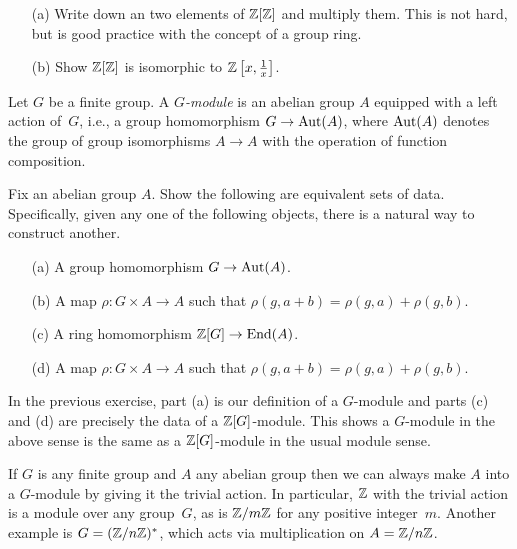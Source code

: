 \begin{exercise}
	\hfill
	\begin{enumerate}
		\item[(a)]
			Write down an two elements of $\mathbb{Z}[\mathbb{Z}]$ and multiply them.
			This is not hard, but is good practice with the concept
			of a group ring.
		\item[(b)]
			Show $\mathbb{Z}[\mathbb{Z}]$ is isomorphic to $\mathbb{Z}\left[x,\frac{1}{x}\right]$.
	\end{enumerate}
\end{exercise}

\begin{definition}
	Let $G$ be a finite group. A \emph{$G$-module} is
	an abelian group $A$ equipped with a left action of~$G$,
	i.e., a group homomorphism $G\to\operatorname{Aut}(A)$, where $\operatorname{Aut}(A)$
	denotes the group of group isomorphisms $A\to A$ with
	the operation of function composition.
\end{definition}

\begin{exercise}\label{ex:equivalentdata}
	Fix an abelian group $A$.
	Show the following are equivalent sets of data.
	Specifically, given any one of the following objects,
	there is a natural way to construct another.
	\begin{enumerate}
		\item[(a)] A group homomorphism $G\to \operatorname{Aut}(A)$.
		\item[(b)] A map $\rho:G\times A \to A$ such that
			$\rho(g,a+b) = \rho(g,a) + \rho(g,b)$.
		\item[(c)] A ring homomorphism $\mathbb{Z}[G] \to \operatorname{End}(A)$.
		\item[(d)] A map $\rho:G\times A \to A$ such that
					$\rho(g,a+b) = \rho(g,a) + \rho(g,b)$.
	\end{enumerate}
\end{exercise}

\begin{remark}
	In the previous exercise, part (a) is our definition
	of a $G$-module and parts (c) and (d) are precisely
	the data of a $\mathbb{Z}[G]$-module. This shows a $G$-module
	in the above sense is the same as a $\mathbb{Z}[G]$-module
	in the usual module sense.
\end{remark}

\begin{example}
	If $G$ is any finite group and $A$ any abelian group
	then we can always make $A$ into a $G$-module by
	giving it the trivial action.
	In particular, $\mathbb{Z}$ with the trivial action is a
	module over any group~$G$, as is $\mathbb{Z}/m\mathbb{Z}$ for any positive
	integer~$m$. Another example is $G=(\mathbb{Z}/n\mathbb{Z})^*$, which acts
	via multiplication on $A = \mathbb{Z}/n\mathbb{Z}$.
\end{example}

